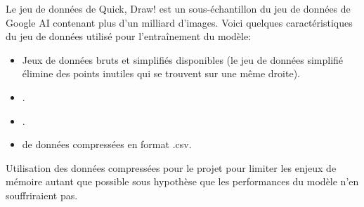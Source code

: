 Le jeu de données de Quick, Draw! est un sous-échantillon du jeu de données de Google AI contenant plus d'un milliard d'images. Voici quelques caractéristiques du jeu de données utilisé pour l'entraînement du modèle:

\begin{itemize}
	\item Jeux de données bruts et simplifiés disponibles (le jeu de données simplifié élimine des points inutiles qui se trouvent sur une même droite).
	\item {}.
	\item {}.
	\item {} de données compressées en format .csv.
\end{itemize}

Utilisation des données compressées pour le projet pour limiter les enjeux de mémoire autant que possible sous hypothèse que les performances du modèle n'en souffriraient pas.

\vspace{-.5mm}